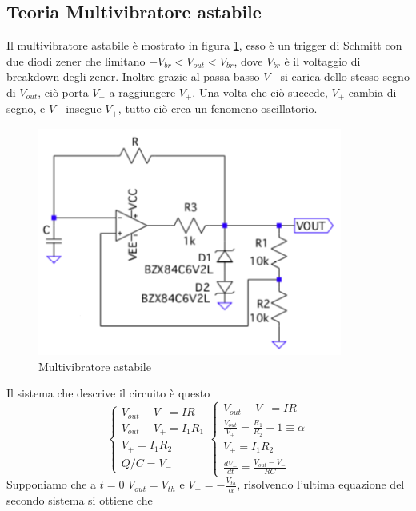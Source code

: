 \documentclass{article}
\begin{document}
		\subsection{Teoria Multivibratore astabile}
			Il multivibratore astabile è mostrato in figura \ref{fig:multivibratore}, esso è un trigger di Schmitt con due diodi zener che limitano $-V_{br}<V_{out}<V_{br}$, dove $V_{br}$ è il voltaggio di breakdown degli zener. Inoltre grazie al passa-basso $V_-$ si carica dello stesso segno di $V_{out}$, ciò porta $V_-$ a raggiungere $V_+$.\newline
			Una volta che ciò succede, $V_+$ cambia di segno, e $V_-$ insegue $V_+$, tutto ciò crea un fenomeno oscillatorio.\newline
			\begin{figure}
				\label{fig:multivibratore}
				\centering
				\includegraphics[width=100mm]{immagini/multivibratore.png}
				\caption{Multivibratore astabile}
			\end{figure}
			Il sistema che descrive il circuito è questo
			\begin{equation}
				\begin{cases}
					V_{out}-V_-=IR\\
					V_{out}-V_+=I_1R_1\\
					V_+=I_1R_2\\
					Q/C=V_-
				\end{cases}
				\begin{cases}
					V_{out}-V_-=IR\\
					\frac{V_{out}}{V_+}=\frac{R_1}{R_2}+1\equiv \alpha\\
					V_+=I_1R_2\\
					\frac{dV_-}{dt}=\frac{V_{out}-V_-}{RC}
				\end{cases}
			\end{equation}
			Supponiamo che a $t=0$ $V_{out}=V_{th}$ e $V_-=-\frac{V_{th}}{\alpha}$, risolvendo l'ultima equazione del secondo sistema si ottiene che
\end{document}
